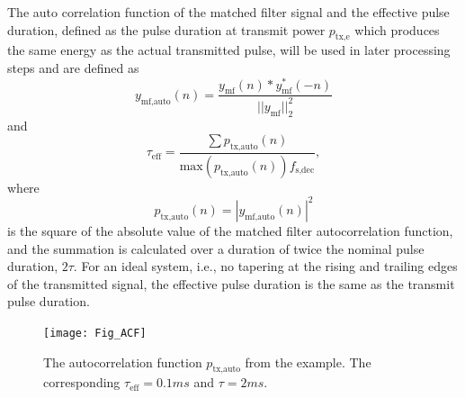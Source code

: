 \documentclass[preprint,12pt,TurnOnLineNumbers]{JASAnew}
\newcommand{\samplesymt}{n}
\newcommand{\fsdec}{f_{\textrm{s,dec}}}
\newcommand{\ptxe}{p_{\textrm{tx,e}}}
\newcommand{\tnom}{\tau}
\newcommand{\teff}{\tau_{\textrm{eff}}}
\newcommand{\ymf}{y_{\textrm{mf}}}
\newcommand{\ymfauto}{y_{\textrm{mf,auto}}}
\newcommand{\ptxauto}{p_{\textrm{tx,auto}}}
\begin{document}
The auto correlation function of the matched filter signal and the effective pulse duration, defined as the pulse duration at transmit power $\ptxe$ which produces the same energy as the actual transmitted pulse, will be used in later processing steps and are defined as
\begin{equation}
\label{eq:TXAuto}
\ymfauto(\samplesymt) = \frac{\ymf(\samplesymt)*\ymf^*(-\samplesymt)}{||\ymf||^2_2}
\end{equation}
and
\begin{equation}
\label{eq:TauEff}
\teff = \frac{\sum \ptxauto(\samplesymt)}{\textrm{max}(\ptxauto(\samplesymt))\fsdec},
\end{equation}
where
\begin{equation*}
\ptxauto(\samplesymt)  =  |\ymfauto(\samplesymt)|^2
\end{equation*}
is the square of the absolute value of the matched filter autocorrelation function, and the summation is calculated over a duration of twice the nominal pulse duration, $2\tnom$. For an ideal system, i.e., no tapering at the rising and trailing edges of the transmitted signal, the effective pulse duration is the same as the transmit pulse duration.

\begin{figure}
\texttt{[image: Fig\_ACF]}
\caption{The autocorrelation function $\ptxauto$ from the example. The corresponding $\teff=0.1 ms$ and $\tnom=2 ms$\label{fi:ACF}.}
\end{figure}
\end{document}
